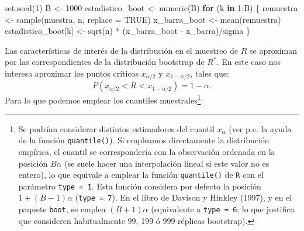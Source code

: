 \documentclass[
]{book}
\newenvironment{Shaded}{\begin{snugshade}}{\end{snugshade}}
\newcommand{\AttributeTok}[1]{\textcolor[rgb]{0.77,0.63,0.00}{#1}}
\newcommand{\ConstantTok}[1]{\textcolor[rgb]{0.00,0.00,0.00}{#1}}
\newcommand{\ControlFlowTok}[1]{\textcolor[rgb]{0.13,0.29,0.53}{\textbf{#1}}}
\newcommand{\DecValTok}[1]{\textcolor[rgb]{0.00,0.00,0.81}{#1}}
\newcommand{\FunctionTok}[1]{\textcolor[rgb]{0.00,0.00,0.00}{#1}}
\newcommand{\NormalTok}[1]{#1}
\newcommand{\OtherTok}[1]{\textcolor[rgb]{0.56,0.35,0.01}{#1}}
\newcommand{\SpecialCharTok}[1]{\textcolor[rgb]{0.00,0.00,0.00}{#1}}
\theoremstyle{break}
\theoremstyle{definition}
\theoremstyle{definition}
\theoremstyle{definition}
\theoremstyle{definition}
\theoremstyle{remark}
\begin{document}
\begin{Shaded}
\begin{Highlighting}[]
\FunctionTok{set.seed}\NormalTok{(}\DecValTok{1}\NormalTok{)}
\NormalTok{B }\OtherTok{\textless{}{-}} \DecValTok{1000}
\NormalTok{estadistico\_boot }\OtherTok{\textless{}{-}} \FunctionTok{numeric}\NormalTok{(B)}
\ControlFlowTok{for}\NormalTok{ (k }\ControlFlowTok{in} \DecValTok{1}\SpecialCharTok{:}\NormalTok{B) \{}
\NormalTok{    remuestra }\OtherTok{\textless{}{-}} \FunctionTok{sample}\NormalTok{(muestra, n, }\AttributeTok{replace =} \ConstantTok{TRUE}\NormalTok{)}
\NormalTok{    x\_barra\_boot }\OtherTok{\textless{}{-}} \FunctionTok{mean}\NormalTok{(remuestra)}
\NormalTok{    estadistico\_boot[k] }\OtherTok{\textless{}{-}} \FunctionTok{sqrt}\NormalTok{(n) }\SpecialCharTok{*}\NormalTok{ (x\_barra\_boot }\SpecialCharTok{{-}}\NormalTok{ x\_barra)}\SpecialCharTok{/}\NormalTok{sigma}
\NormalTok{\}}
\end{Highlighting}
\end{Shaded}

Las características de interés de la distribución en el muestreo de \(R\)
se aproximan por las correspondientes de la distribución bootstrap de \(R^{\ast}\).
En este caso nos interesa aproximar los puntos críticos \(x_{\alpha /2}\) y
\(x_{1-\alpha /2}\), tales que:
\[P\left( x_{\alpha /2} < R < x_{1-\alpha /2} \right) = 1-\alpha.\]
Para lo que podemos emplear los cuantiles muestrales\footnote{
  Se podrían considerar distintos estimadores del cuantil \(x_{\alpha}\)
  (ver p.e. la ayuda de la función \texttt{quantile()}).
  Si empleamos directamente la distribución empírica, el cuantil se
  correspondería con la observación ordenada en la posición \(B \alpha\)
  (se suele hacer una interpolación lineal si este valor no es entero),
  lo que equivale a emplear la función \texttt{quantile()} de \texttt{R} con el parámetro
  \texttt{type\ =\ 1}. Esta función considera por defecto la posición
  \(1 + (B - 1) \alpha\) (\texttt{type\ =\ 7}).
  En el libro de Davison y Hinkley (1997), y en el paquete \texttt{boot}, se emplea \((B + 1) \alpha\) (equivalente a \texttt{type\ =\ 6}; lo que justifica que
  consideren habitualmente 99, 199 ó 999 réplicas bootstrap).}:
\end{document}
